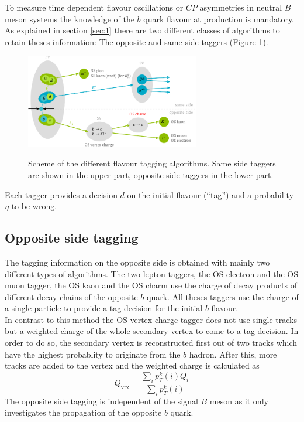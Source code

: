 \documentclass{PoS}
\begin{document}
To measure time dependent flavour oscillations or $C\!P$ asymmetries  in neutral $B$ meson systems the knowledge of the $b$ quark flavour at production is mandatory. As explained in section \ref{sec:1} there are two different classes of algorithms to retain theses information: The opposite and same side taggers (Figure \ref{fig:flavtagscheme}).
\begin{figure}[htbp]
	\begin{center}
		\includegraphics[width=0.68\textwidth, angle=0]{figs/FlavourTaggerScheme.pdf}
		\small{\caption{Scheme of the different flavour tagging algorithms. Same side taggers are shown in the upper part, opposite side taggers in the lower part.}}
		\label{fig:flavtagscheme}
	\end{center}
\end{figure}
Each tagger provides a decision $d$ on the initial flavour (\enquote{tag}) and a probability $\eta$ to be wrong.

\subsection{Opposite side tagging}\label{sec:OStagging}

The tagging information on the opposite side is obtained with mainly two different types of algorithms. The two lepton taggers, the OS electron and the OS muon tagger, the OS kaon and the OS charm use the charge of decay products of different decay chains of the opposite $b$ quark. All theses taggers use the charge of a single particle to provide a tag decision for the initial $b$ flavour.\\
In contrast to this method the OS vertex charge tagger does not use single tracks but a weighted charge of the whole secondary vertex to come to a tag decision. In order to do so, the secondary vertex is reconstructed first out of two tracks which have the highest probablity to originate from the $b$ hadron. After this, more tracks are added to the vertex and the weighted charge is calculated as
\begin{equation}
Q_\text{vtx}=\frac{\sum_i p_T^k(i)Q_i}{\sum_i p_T^k(i)}
\end{equation}  
The opposite side tagging is independent of the signal $B$ meson as it only investigates the propagation of the opposite $b$ quark.
\end{document}
